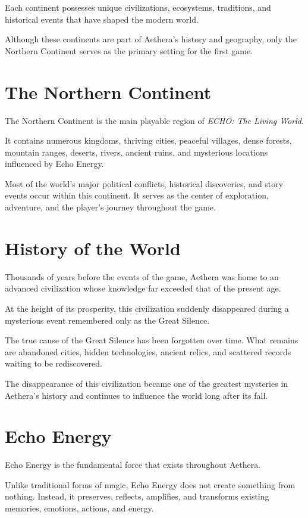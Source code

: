 Each continent possesses unique civilizations, ecosystems, traditions, and historical events that have shaped the modern world.

Although these continents are part of Aethera's history and geography, only the Northern Continent serves as the primary setting for the first game.

\section{The Northern Continent}

The Northern Continent is the main playable region of \textit{ECHO: The Living World}.

It contains numerous kingdoms, thriving cities, peaceful villages, dense forests, mountain ranges, deserts, rivers, ancient ruins, and mysterious locations influenced by Echo Energy.

Most of the world's major political conflicts, historical discoveries, and story events occur within this continent. It serves as the center of exploration, adventure, and the player's journey throughout the game.

\section{History of the World}

Thousands of years before the events of the game, Aethera was home to an advanced civilization whose knowledge far exceeded that of the present age.

At the height of its prosperity, this civilization suddenly disappeared during a mysterious event remembered only as the Great Silence.

The true cause of the Great Silence has been forgotten over time. What remains are abandoned cities, hidden technologies, ancient relics, and scattered records waiting to be rediscovered.

The disappearance of this civilization became one of the greatest mysteries in Aethera's history and continues to influence the world long after its fall.

\section{Echo Energy}

Echo Energy is the fundamental force that exists throughout Aethera.

Unlike traditional forms of magic, Echo Energy does not create something from nothing. Instead, it preserves, reflects, amplifies, and transforms existing memories, emotions, actions, and energy.


